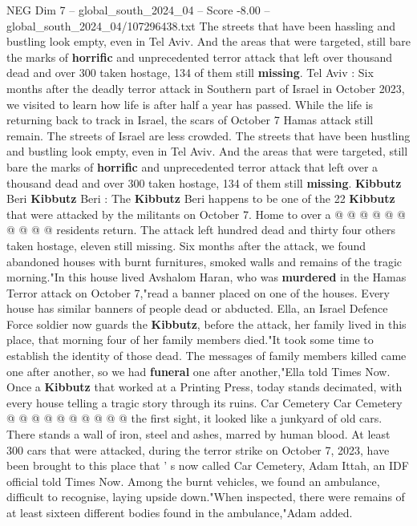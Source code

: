 \begin{textsample}{NEG Dim 7 – global\_south\_2024\_04 – Score -8.00 – global\_south\_2024\_04/107296438.txt}  \label{ex:f7_neg_341}
The streets that have been hassling and bustling look empty, even in Tel Aviv.
And the areas that were targeted, still bare the marks of \textbf{horrific} and unprecedented terror attack that left over thousand dead and over 300 taken hostage, 134 of them still \textbf{missing}.
Tel Aviv : Six months after the deadly terror attack in Southern part of Israel in October 2023, we visited to learn how life is after half a year has passed.
While the life is returning back to track in Israel, the scars of October 7 Hamas attack still remain.
The streets of Israel are less crowded.
The streets that have been hustling and bustling look empty, even in Tel Aviv.
And the areas that were targeted, still bare the marks of \textbf{horrific} and unprecedented terror attack that left over a thousand dead and over 300 taken hostage, 134 of them still \textbf{missing}. \textbf{Kibbutz} Beri \textbf{Kibbutz} Beri : The \textbf{Kibbutz} Beri happens to be one of the 22 \textbf{Kibbutz} that were attacked by the militants on October 7.
Home to over a @ @ @ @ @ @ @ @ @ @ residents return.
The attack left hundred dead and thirty four others taken hostage, eleven still missing.
Six months after the attack, we found abandoned houses with burnt furnitures, smoked walls and remains of the tragic morning."In this house lived Avshalom Haran, who was \textbf{murdered} in the Hamas Terror attack on October 7,"read a banner placed on one of the houses.
Every house has similar banners of people dead or abducted.
Ella, an Israel Defence Force soldier now guards the \textbf{Kibbutz}, before the attack, her family lived in this place, that morning four of her family members died."It took some time to establish the identity of those dead.
The messages of family members killed came one after another, so we had \textbf{funeral} one after another,"Ella told Times Now.
Once a \textbf{Kibbutz} that worked at a Printing Press, today stands decimated, with every house telling a tragic story through its ruins.
Car Cemetery Car Cemetery @ @ @ @ @ @ @ @ @ @ the first sight, it looked like a junkyard of old cars.
There stands a wall of iron, steel and ashes, marred by human blood.
At least 300 cars that were attacked, during the terror strike on October 7, 2023, have been brought to this place that ' s now called Car Cemetery, Adam Ittah, an IDF official told Times Now.
Among the burnt vehicles, we found an ambulance, difficult to recognise, laying upside down."When inspected, there were remains of at least sixteen different bodies found in the ambulance,"Adam added.

\end{textsample}
